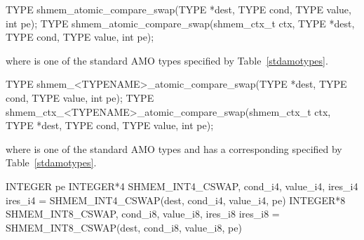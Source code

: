 
\begin{apidefinition}

\begin{C11synopsis}
TYPE shmem_atomic_compare_swap(TYPE *dest, TYPE cond, TYPE value, int pe);
TYPE shmem_atomic_compare_swap(shmem_ctx_t ctx, TYPE *dest, TYPE cond, TYPE value, int pe);
\end{C11synopsis}
where \TYPE{} is one of the standard \ac{AMO} types specified by
Table~\ref{stdamotypes}.

\begin{Csynopsis}
TYPE shmem_<TYPENAME>_atomic_compare_swap(TYPE *dest, TYPE cond, TYPE value, int pe);
TYPE shmem_ctx_<TYPENAME>_atomic_compare_swap(shmem_ctx_t ctx, TYPE *dest, TYPE cond, TYPE value, int pe);
\end{Csynopsis}
where \TYPE{} is one of the standard \ac{AMO} types and has a corresponding
\TYPENAME{} specified by Table~\ref{stdamotypes}.

\begin{Fsynopsis}
INTEGER pe
INTEGER*4 SHMEM_INT4_CSWAP,  cond_i4, value_i4, ires_i4
ires_i4 = SHMEM_INT4_CSWAP(dest, cond_i4, value_i4, pe)
INTEGER*8 SHMEM_INT8_CSWAP,  cond_i8, value_i8, ires_i8
ires_i8 = SHMEM_INT8_CSWAP(dest, cond_i8, value_i8, pe)
\end{Fsynopsis}

\begin{apiarguments}
\end{apiarguments}


\end{apidefinition}
